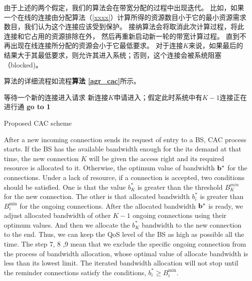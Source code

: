 由于上述的两个假定，我们的算法会在带宽分配的过程中出现迭代。
比如，如果一个在线的连接由分配算法（\ref{xxxx}）计算所得的资源数目小于它的最小资源需求数目，我们认为这个连接应该受到保护。
接纳算法会将取消此次计算过程，将此连接和它占用的资源排除在外，
然后再重新启动新一轮的带宽计算过程。
直到不再出现在线连接所分配的资源会小于它最低要求。
对于连接$K$来说，如果最后的结果大于其最低要求，则允许其进入系统；否则，这个连接会被系统阻塞（blocked)。

算法的详细流程如流程{\bf{算法 \ref{agr_cac}}}所示。

\begin{algorithm}[!htpb]
\SetAlgoLined
等待一个新的连接进入请求\;
新连接$K$申请进入；假定此时系统中有$K-1$连接正在进行通\;
{\bf{go to 1}}\;
\caption{Proposed CAC scheme} \label{agr_cac}
\end{algorithm}

After a new incoming connection sends its request of entry to a BS, CAC process starts. 
If the BS has the available bandwidth enough for the its demand at that time, the new connection $K$ will be given the access right and its required resource is allocated to it.
Otherwise, the optimum value of bandwidth $\bf{b^*}$ for the connections.
Under a lack of resource, if a connection is accepted, two conditions should be satisfied. 
One is that the value $b_K^*$ is greater than the threshold $B_K^{min}$ for the new connection. 
The other is that allocated bandwidth $b_i^*$ is greater than $B_i^{\min}$ for the ongoing connections. 
After the allocated bandwidth $\bf b^*$ is ready, we adjust allocated bandwidth of other $K-1$ ongoing connections using their optimum values. 
And then we allocate the $b_K^*$ bandwidth to the new connection to the end. 
Thus, we can keep the QoS level of the BS as high as possible all the time. 
The step 7, 8 ,9 mean that we exclude the specific ongoing connection from the process of bandwidth allocation, whose optimal value of allocate bandwidth is less than its lowest limit. 
The iterated bandwidth allocation will not stop until the reminder connections satisfy the conditions, $b_i^* \ge B_i^{\min}$.

%


